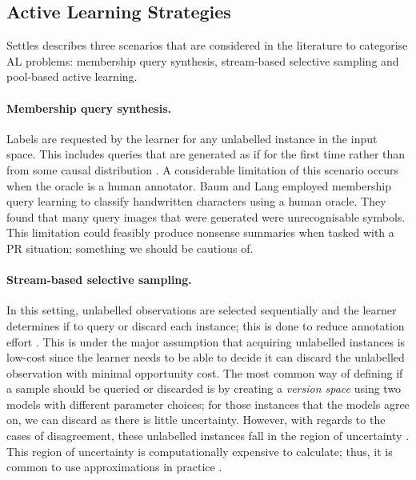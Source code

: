 \documentclass[ %
                    author={James Stephenson},
                supervisor={Dr. Edwin Simpson},
                    degree={MSc},
                     title={PROJECT PLAN},
                  subtitle={Bayesian Deep Learning For Extractive Test Summarisation},
                      type={},
                      year={2022}]{../additions/dissertation}
\begin{document}
			\subsection{Active Learning Strategies}
			\label{chap:literaturereview:active:strategies}
			
				Settles \cite{Settles09} describes three scenarios that are considered in the literature to categorise AL problems: membership query synthesis, stream-based selective sampling and pool-based active learning.

				\paragraph{Membership query synthesis.}  Labels are requested by the learner for any unlabelled instance in the input space. This includes queries that are generated as if for the first time rather than from some causal distribution \cite{Angluin88}. A considerable limitation of this scenario occurs when the oracle is a human annotator. Baum and Lang \cite{Baum92} employed membership query learning to classify handwritten characters using a human oracle. They found that many query images that were generated were unrecognisable symbols. This limitation could feasibly produce nonsense summaries when tasked with a PR situation; something we should be cautious of.

				\paragraph{Stream-based selective sampling.} In this setting, unlabelled observations are selected sequentially and the learner determines if to query or discard each instance; this is done to reduce annotation effort \cite{Cohn94}. This is under the major assumption that acquiring unlabelled instances is low-cost since the learner needs to be able to decide it can discard the unlabelled observation with minimal opportunity cost. The most common way of defining if a sample should be queried or discarded is by creating a \emph{version space} \cite{Mitchell82} using two models with different parameter choices; for those instances that the models agree on, we can discard as there is little uncertainty. However, with regards to the cases of disagreement, these unlabelled instances fall in the region of uncertainty \cite{Settles09}. This region of uncertainty is computationally expensive to calculate; thus, it is common to use approximations in practice \cite{Seung92, Cohn94, Dasgupta07}.
\end{document}
